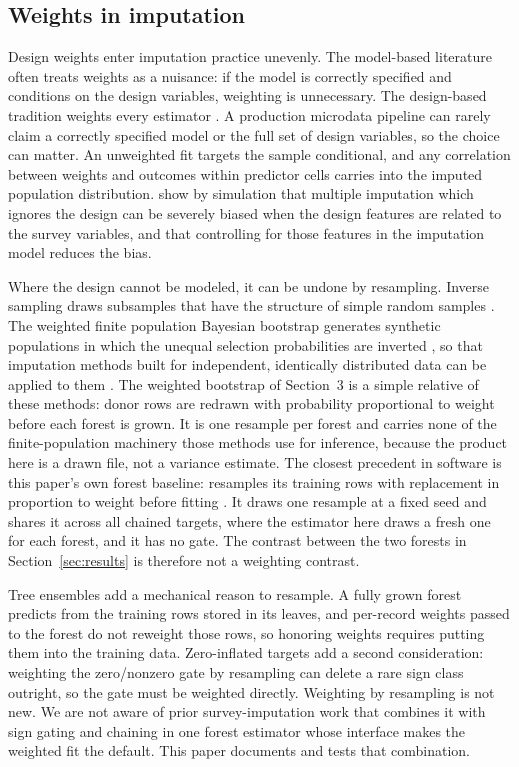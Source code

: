 \subsection{Weights in imputation}
\label{sec:background-weights}

Design weights enter imputation practice unevenly. The model-based literature
often treats weights as a nuisance: if the model is correctly specified and
conditions on the design variables, weighting is unnecessary. The
design-based tradition weights every estimator \citep{little2002statistical}.
A production microdata pipeline can rarely claim a correctly specified model
or the full set of design variables, so the choice can matter. An unweighted
fit targets the sample conditional, and any correlation between weights and
outcomes within predictor cells carries into the imputed population
distribution. \citet{reiter2006importance} show by simulation that
multiple imputation which ignores the design can be severely biased when the
design features are related to the survey variables, and that controlling for
those features in the imputation model reduces the bias.

Where the design cannot be modeled, it can be undone by resampling. Inverse
sampling draws subsamples that have the structure of simple random samples
\citep{hinkins1997inverse}. The weighted finite population Bayesian bootstrap
generates synthetic populations in which the unequal selection probabilities
are inverted \citep{dong2014nonparametric}, so that imputation methods built
for independent, identically distributed data can be applied to them
\citep{zhou2016two}. The weighted bootstrap of Section~3 is a simple relative
of these methods: donor rows are redrawn with probability proportional to
weight before each forest is grown. It is one resample per forest and carries
none of the finite-population machinery those methods use for inference,
because the product here is a drawn file, not a variance estimate. The
closest precedent in software is this paper's own forest baseline:
\microimpute{} resamples its training rows with replacement in proportion to
weight before fitting \citep{policyengine2025microimpute}. It draws one
resample at a fixed seed and shares it across all chained targets, where the
estimator here draws a fresh one for each forest, and it has no gate. The
contrast between the two forests in Section~\ref{sec:results} is therefore
not a weighting contrast.

Tree ensembles add a mechanical reason to resample. A fully grown forest
predicts from the training rows stored in its leaves, and per-record weights
passed to the forest do not reweight those rows, so honoring weights
requires putting them into the training data. Zero-inflated
targets add a second consideration: weighting the zero/nonzero gate by
resampling can delete a rare sign class outright, so the gate must be
weighted directly. Weighting by resampling is not new. We are not aware of
prior survey-imputation work that combines it with sign gating and
chaining in one forest estimator whose interface makes the weighted fit the
default. This paper documents and tests that combination.

